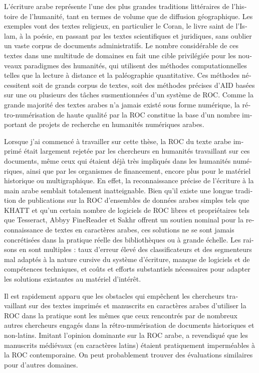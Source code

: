 \begin{french}
L'écriture arabe représente l'une des plus grandes traditions littéraires de
l'histoire de l'humanité, tant en termes de volume que de diffusion
géographique. Les exemples vont des textes religieux, en particulier le Coran,
le livre saint de l'Islam, à la poésie, en passant par les textes scientifiques
et juridiques, sans oublier un vaste corpus de documents administratifs. Le
nombre considérable de ces textes dans une multitude de domaines en fait une
cible privilégiée pour les nouveaux paradigmes des humanités, qui utilisent des
méthodes computationnelles telles que la lecture à distance et la paléographie
quantitative. Ces méthodes nécessitent soit de grands corpus de textes, soit
des méthodes précises d'AID basées sur une ou plusieurs des tâches
susmentionnées d'un système de ROC. Comme la grande majorité des textes arabes
n'a jamais existé sous forme numérique, la rétro-numérisation de haute
qualité par la ROC constitue la base d'un nombre important de projets de recherche
en humanités numériques arabes.

Lorsque j'ai commencé à travailler sur cette thèse, la ROC du texte arabe
imprimé était largement rejetée par les chercheurs en humanités 
travaillant sur ces documents, même ceux qui étaient déjà très impliqués dans
les humanités numériques, ainsi que par les organismes de financement, encore plus pour le matériel historique ou multigraphique. En effet, la
reconnaissance précise de l'écriture à la main arabe semblait totalement
inatteignable. Bien qu'il existe une longue tradition de publications sur la
ROC d'ensembles de données arabes simples tels que KHATT\cite{mahmoud2014khatt}
et qu'un certain nombre de logiciels de ROC libres et propriétaires tels que
Tesseract, Abbyy FineReader et Sakhr offrent un soutien nominal pour la
reconnaissance de textes en caractères arabes, ces solutions ne se sont jamais
concrétisées dans la pratique réelle des bibliothèques ou à
grande échelle. Les raisons en sont multiples : taux d'erreur élevé des
classificateurs et des segmenteurs mal adaptés à la nature cursive du système
d'écriture, manque de logiciels et de compétences techniques, et coûts et efforts substantiels nécessaires pour adapter les
solutions existantes au matériel d'intérêt.

Il est rapidement apparu que les obstacles qui empêchent les chercheurs
travaillant sur des textes imprimés et manuscrits en caractères arabes
d'utiliser la ROC dans la pratique sont les mêmes que ceux rencontrés par de
nombreux autres chercheurs engagés dans la rétro-numérisation de documents
historiques et non-latins. Imitant l'opinion dominante sur la ROC arabe,
\cite{widner2017toward} a revendiqué que les manuscrits médiévaux (en
caractères latins) étaient pratiquement imperméables à la ROC contemporaine. On
peut probablement trouver des évaluations similaires pour d'autres domaines.


\end{french}
